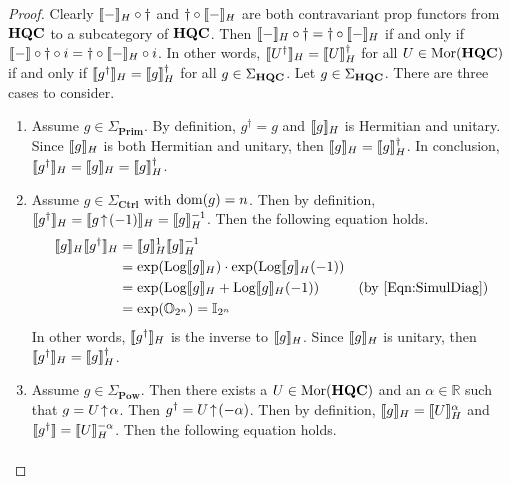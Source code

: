 \begin{proof}
    Clearly $\llbracket-\rrbracket_H \circ \dagger$ and $\dagger \circ \llbracket-\rrbracket_H$ are both contravariant prop functors from $\mathbf{HQC}$ to a subcategory of $\mathbf{HQC}$.
    Then $\llbracket-\rrbracket_H \circ \dagger = \dagger \circ \llbracket-\rrbracket_H$ if and only if $\llbracket-\rrbracket \circ \dagger \circ i = \dagger \circ \llbracket-\rrbracket_H \circ i$.
    In other words, $\llbracket U^\dagger\rrbracket_H = \llbracket U\rrbracket_H^\dagger$ for all $U \in \operatorname{Mor}( \mathbf{HQC} )$ if and only if $\llbracket g^\dagger\rrbracket_H = \llbracket g\rrbracket_H^\dagger$ for all $g \in \Sigma_{\mathbf{HQC}}$.
    Let $g \in \Sigma_{\mathbf{HQC}}$.
    There are three cases to consider.
    \begin{enumerate}
    \item Assume $g \in \Sigma_{\textbf{Prim}}$.
          By definition, $g^\dagger = g$ and $\llbracket g\rrbracket_H$ is Hermitian and unitary.
          Since $\llbracket g\rrbracket_H$ is both Hermitian and unitary, then $\llbracket g\rrbracket_H = \llbracket g\rrbracket_H^\dagger$.
          In conclusion, $\llbracket g^\dagger\rrbracket_H = \llbracket g\rrbracket_H = \llbracket g\rrbracket_H^\dagger$.
    \item Assume $g \in \Sigma_{\textbf{Ctrl}}$ with $\operatorname{dom}( g ) = n$.
          Then by definition, $\llbracket g^\dagger\rrbracket_H = \llbracket g \!\uparrow\! (-1)\rrbracket_H = \llbracket g\rrbracket_H^{-1}$.
          Then the following equation holds.
          \begin{align*}
              \sem{g}_H \sem{g^\dagger}_H
              &=
              \sem{g}_H^1 \sem{g}_H^{-1}
              \\
              &=
              \exp( \Log\sem{g}_H ) \cdot \exp( \Log\sem{g}_H (-1) )
              \\
              &=
              \exp( \Log\sem{g}_H + \Log\sem{g}_H (-1) )
              &
              ( \text{by~\cref{Eqn:SimulDiag}} )
              \\
              &=
              \exp( \mathbb{O}_{2^n} )
              =
              \mathbb{I}_{2^n}
          \end{align*}
          In other words, $\llbracket g^\dagger\rrbracket_H$ is the inverse to $\llbracket g\rrbracket_H$.
          Since $\llbracket g\rrbracket_H$ is unitary, then $\llbracket g^\dagger\rrbracket_H = \llbracket g\rrbracket_H^\dagger$.
    \item Assume $g \in \Sigma_{\textbf{Pow}}$.
          Then there exists a $U \in \operatorname{Mor}( \mathbf{HQC} )$ and an $\alpha \in \mathbb{R}$ such that $g = U \!\uparrow\! \alpha$.
          Then $g^\dagger = U \!\uparrow\! ( -\alpha )$.
          Then by definition, $\llbracket g\rrbracket_H = \llbracket U\rrbracket_H^\alpha$ and $\llbracket g^\dagger\rrbracket = \llbracket U\rrbracket_H^{-\alpha}$.
          Then the following equation holds.
          \begin{align*}

\end{align*}
\end{enumerate}
\end{proof}
